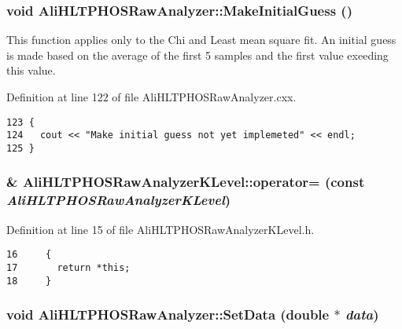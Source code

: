 \subsubsection{\setlength{\rightskip}{0pt plus 5cm}void Ali\-HLTPHOSRaw\-Analyzer::Make\-Initial\-Guess ()\hspace{0.3cm}{\tt  [inherited]}}\label{classAliHLTPHOSRawAnalyzer_AliHLTPHOSRawAnalyzerPeakFindera14}


This function applies only to the Chi and Least mean square fit. An initial guess is made based on the average of the first 5 samples and the first value exeeding this value. 

Definition at line 122 of file Ali\-HLTPHOSRaw\-Analyzer.cxx.

\footnotesize\begin{verbatim}123 {
124   cout << "Make initial guess not yet implemeted" << endl;
125 }
\end{verbatim}\normalsize 


\subsubsection{\& Ali\-HLTPHOSRaw\-Analyzer\-KLevel::operator= (const  {\em Ali\-HLTPHOSRaw\-Analyzer\-KLevel})\hspace{0.3cm}{\tt  [inline]}}\label{classAliHLTPHOSRawAnalyzerKLevel_AliHLTPHOSRawAnalyzerKLevela2}




Definition at line 15 of file Ali\-HLTPHOSRaw\-Analyzer\-KLevel.h.

\footnotesize\begin{verbatim}16     {
17       return *this; 
18     }
\end{verbatim}\normalsize 


\subsubsection{\setlength{\rightskip}{0pt plus 5cm}void Ali\-HLTPHOSRaw\-Analyzer::Set\-Data (double $\ast$ {\em data})\hspace{0.3cm}{\tt  [inherited]}}\label{classAliHLTPHOSRawAnalyzer_AliHLTPHOSRawAnalyzerPeakFindera12}



